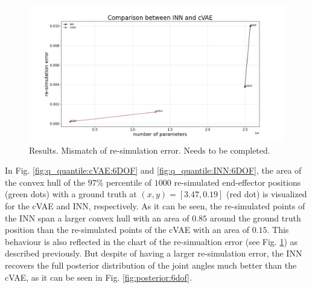 \documentclass[conference]{IEEEtran}
\begin{document}
\begin{figure}[!ht]
\centering
	\includegraphics[width=\linewidth]{figures/comparison_e_resim_alternative.jpg}
    \caption{\label{fig:plot:resim} Results. Mismatch of re-simulation error. Needs to be completed.}
\end{figure}

In Fig. \ref{fig:q_quantile:cVAE:6DOF} and \ref{fig:q_quantile:INN:6DOF}, the area of the convex hull of the $97\%$ percentile of $1000$ re-simulated end-effector positions (green dots) with a ground truth at $(x, y) = [3.47, 0.19]$ (red dot) is visualized for the cVAE and INN, respectively.  As it can be seen, the re-simulated points of the INN span a larger convex hull with an area of $0.85$ around the ground truth position than the re-simulated points of the cVAE with an area of $0.15$. This behaviour is also reflected in the chart of the re-simualtion error (see Fig. \ref{fig:plot:resim}) as described previously. But despite of having a larger re-simulation error, the INN recovers the full posterior distribution of the joint angles much better than the cVAE, as it can be seen in Fig. \ref{fig:posterior:6dof}. 
\end{document}
